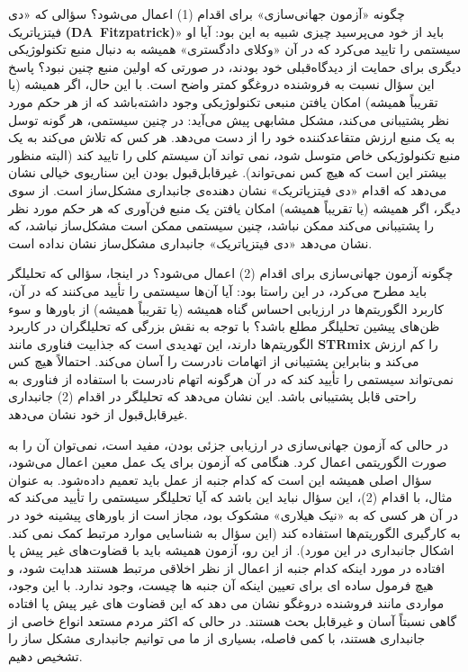 چگونه «آزمون جهانی‌سازی» برای اقدام (1) اعمال می‌شود؟ سؤالی که «دی فیتزپاتریک \textenglish{\textbf{\mbox{(DA Fitzpatrick)}}}» باید از خود می‌پرسید چیزی شبیه به این بود: آیا او سیستمی را تایید می‌کرد که در آن «وکلای دادگستری» همیشه به دنبال منبع تکنولوژیکی دیگری برای حمایت از دیدگاه‌قبلی خود بودند، در صورتی که اولین منبع چنین نبود؟ پاسخ این سؤال نسبت به فروشنده دروغگو کمتر واضح است.
با این حال، اگر همیشه (یا تقریباً همیشه) امکان یافتن منبعی تکنولوژیکی وجود داشته‌باشد که از هر حکم مورد نظر پشتیبانی می‌کند، مشکل مشابهی پیش می‌آید: در چنین سیستمی، هر گونه توسل به یک منبع ارزش متقاعدکننده خود را از دست می‌دهد.
هر کس که تلاش می‌کند به یک منبع تکنولوژیکی خاص متوسل شود، نمی تواند آن سیستم کلی را تایید کند (البته منظور بیشتر این است که هیچ کس نمی‌تواند).
غیرقابل‌قبول بودن این سناریوی خیالی نشان می‌دهد که اقدام «دی فیتزپاتریک» نشان دهنده‌ی جانبداری مشکل‌ساز است.
از سوی دیگر، اگر همیشه (یا تقریباً همیشه) امکان یافتن یک منبع فن‌آوری که هر حکم مورد نظر را پشتیبانی می‌کند ممکن نباشد، چنین سیستمی ممکن است مشکل‌ساز نباشد، که نشان می‌دهد «دی فیتزپاتریک» جانبداری مشکل‌ساز نشان نداده است.

چگونه آزمون جهانی‌سازی برای اقدام (2) اعمال می‌شود؟ در اینجا، سؤالی که تحلیلگر باید مطرح می‌کرد، در این راستا بود: آیا آن‌ها سیستمی را تأیید می‌کنند که در آن، کاربرد الگوریتم‌ها در ارزیابی احساس گناه همیشه (یا تقریباً همیشه) از باورها و سوء ظن‌های پیشین تحلیلگر مطلع باشد؟ با توجه به نقش بزرگی که تحلیلگران در کاربرد الگوریتم‌ها دارند، این تهدیدی است که جذابیت فناوری مانند \textenglish{\textbf{STRmix}} را کم ارزش می‌کند و بنابراین پشتیبانی از اتهامات نادرست را آسان می‌کند.
احتمالاً هیچ کس نمی‌تواند سیستمی را تأیید کند که در آن هرگونه اتهام نادرست با استفاده از فناوری به راحتی قابل پشتیبانی باشد.
این نشان می‌دهد که تحلیلگر در اقدام (2) جانبداری غیرقابل‌قبول از خود نشان می‌دهد.

در حالی که آزمون جهانی‌سازی در ارزیابی جزئی بودن، مفید است، نمی‌توان آن را به صورت الگوریتمی اعمال کرد.
هنگامی که آزمون برای یک عمل معین اعمال می‌شود، سؤال اصلی همیشه این است که کدام جنبه از عمل باید تعمیم داده‌شود.
به عنوان مثال، با اقدام (2)، این سؤال نباید این باشد که آیا تحلیلگر سیستمی را تأیید می‌کند که در آن هر کسی که به «نیک هیلاری» مشکوک بود، مجاز است از باورهای پیشینه خود در به کارگیری الگوریتم‌ها استفاده کند (این سؤال به شناسایی موارد مرتبط کمک نمی کند.
اشکال جانبداری در این مورد).
از این رو، آزمون همیشه باید با قضاوت‌های غیر پیش پا افتاده در مورد اینکه کدام جنبه از اعمال از نظر اخلاقی مرتبط هستند هدایت شود، و هیچ فرمول ساده ای برای تعیین اینکه آن جنبه ها چیست، وجود ندارد.
با این وجود، مواردی مانند فروشنده دروغگو نشان می دهد که این قضاوت های غیر پیش پا افتاده گاهی نسبتاً آسان و غیرقابل بحث هستند.
در حالی که اکثر مردم مستعد انواع خاصی از جانبداری هستند، با کمی فاصله، بسیاری از ما می توانیم جانبداری مشکل ساز را تشخیص دهیم.






